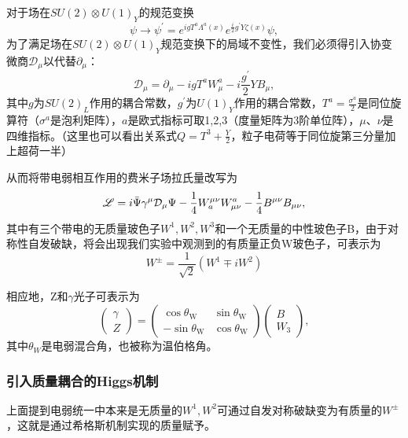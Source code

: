 对于场在$SU(2)\otimes U(1)_Y$的规范变换
\begin{equation}
    \psi \to\psi^\prime=e^{igT^a\Lambda^a(x)}e^{\frac{i}{2}g^\prime Y\zeta(x)}\psi,
\end{equation}
为了满足场在$SU(2)\otimes U(1)_Y$规范变换下的局域不变性，我们必须得引入协变微商$\mathcal{D}_\mu$以代替$\partial_\mu$：
\begin{equation}
    \mathcal{D}_\mu=\partial_\mu -igT^aW_\mu^a-i\frac{g^\prime}{2} Y B_\mu,
\end{equation}
其中$g$为$SU(2)_L$作用的耦合常数，$g^\prime$为$U(1)_Y$作用的耦合常数，$\displaystyle T^a=\frac{\sigma^a}{2}$是同位旋算符（$\sigma^a$是泡利矩阵），$a$是欧式指标可取1,2,3（度量矩阵为3阶单位阵），$\mu$、$\nu$是四维指标。（这里也可以看出关系式$\displaystyle Q=T^3+\frac{Y}{2}$，粒子电荷等于同位旋第三分量加上超荷一半）

从而将带电弱相互作用的费米子场拉氏量改写为
\begin{equation}
    \mathscr{L}=i\Bar{\Psi}\gamma^\mu\mathcal{D}_\mu \Psi-\frac{1}{4}W^{\mu\nu}_a W^a_{\mu\nu}-\frac{1}{4}B^{\mu\nu}B_{\mu\nu},
\end{equation}
其中有三个带电的无质量玻色子$W^1,W^2,W^3$和一个无质量的中性玻色子B，由于对称性自发破缺，将会出现我们实验中观测到的有质量正负W玻色子，可表示为
\begin{equation}
    W^{\pm}=\frac{1}{\sqrt{2}}(W^1\mp iW^2)
\end{equation}

相应地，Z和$\gamma$光子可表示为
\begin{equation}
    \begin{pmatrix}
\gamma \\
Z \end{pmatrix} = \begin{pmatrix}
\cos \theta_\text{W} & \sin \theta_\text{W} \\
-\sin \theta_\text{W} & \cos \theta_\text{W} \end{pmatrix} \begin{pmatrix}
B \\
W_3 \end{pmatrix},
\end{equation}
其中$\theta_W$是电弱混合角，也被称为温伯格角。

\subsubsection{引入质量耦合的Higgs机制}
上面提到电弱统一中本来是无质量的$W^1,W^2$可通过自发对称破缺变为有质量的$W^\pm$，这就是通过希格斯机制实现的质量赋予。

